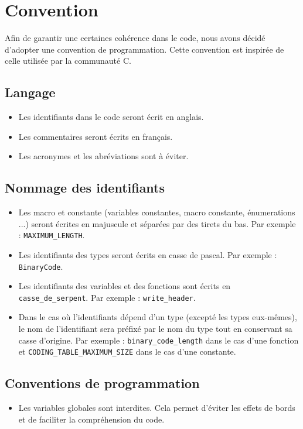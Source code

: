 \section{Convention}

Afin de garantir une certaines cohérence dans le code, nous avons décidé d'adopter une convention de programmation.
Cette convention est inspirée de celle utilisée par la communauté C.

\subsection{Langage}

\begin{itemize}
    \item Les identifiants dans le code seront écrit en anglais.
    \item Les commentaires seront écrits en français.
    \item Les acronymes et les abréviations sont à éviter.
\end{itemize}

\subsection{Nommage des identifiants}

\begin{itemize}
    \item Les macro et constante (variables constantes, macro constante, énumerations ...) seront écrites en majuscule et séparées par des tirets du bas. Par exemple : \texttt{MAXIMUM\_LENGTH}.
    \item Les identifiants des types seront écrits en casse de pascal. Par exemple : \texttt{BinaryCode}.
    \item Les identifiants des variables et des fonctions sont écrits en \texttt{casse\_de\_serpent}. Par exemple : \texttt{write\_header}.
    \item Dans le cas où l'identifiants dépend d'un type (excepté les types eux-mêmes), le nom de l'identifiant sera préfixé par le nom du type tout en conservant sa casse d'origine.
    Par exemple : \texttt{binary\_code\_length} dans le cas d'une fonction et \texttt{CODING\_TABLE\_MAXIMUM\_SIZE} dans le cas d'une constante.
\end{itemize}

\subsection{Conventions de programmation}

\begin{itemize}
    \item Les variables globales sont interdites. Cela permet d'éviter les effets de bords et de faciliter la compréhension du code.
\end{itemize}